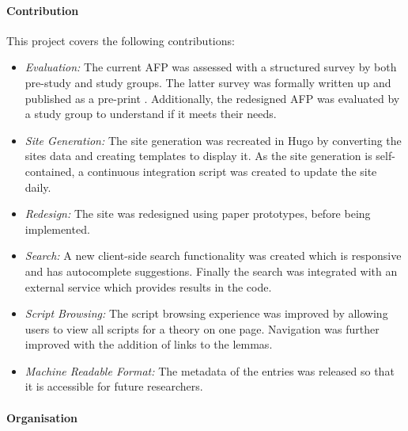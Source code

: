 \documentclass[bsc,frontabs,oneside,singlespacing,parskip,deptreport,logo]{infthesis}
\begin{document}


\paragraph*{Contribution}

This project covers the following contributions:

\begin{itemize}
    \item \emph{Evaluation:} The current AFP was assessed with a structured survey by both pre-study and study groups. The latter survey was formally written up and published as a pre-print \cite{mackenzie2021evaluation}. Additionally, the redesigned AFP was evaluated by a study group to understand if it meets their needs.
    \item \emph{Site Generation:} The site generation was recreated in Hugo by converting the sites data and creating templates to display it. As the site generation is self-contained, a continuous integration script was created to update the site daily.
    \item \emph{Redesign:} The site was redesigned using paper prototypes, before being implemented.
    \item \emph{Search:} A new client-side search functionality was created which is responsive and has autocomplete suggestions. Finally the search was integrated with an external service which provides results in the code.
    \item \emph{Script Browsing:} The script browsing experience was improved by allowing users to view all scripts for a theory on one page. Navigation was further improved with the addition of links to the lemmas.
    \item \emph{Machine Readable Format:} The metadata of the entries was released so that it is accessible for future researchers.
\end{itemize}
\cbend
\paragraph*{Organisation}
\end{document}
